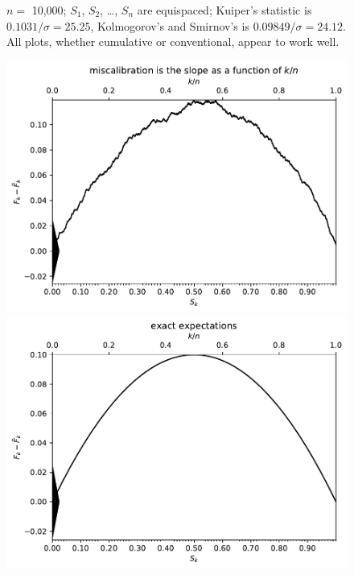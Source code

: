 \documentclass{article}
\begin{document}
\begin{figure}
\begin{centering}
\end{centering}
\caption{$n =$ 10,000; $S_1$, $S_2$, \dots, $S_n$ are equispaced;
         Kuiper's statistic is $0.1031 / \sigma = 25.25$,
         Kolmogorov's and Smirnov's is $0.09849 / \sigma = 24.12$.
All plots, whether cumulative or conventional, appear to work well.
}
\label{10000}
\end{figure}


\begin{figure}
\begin{centering}

\parbox{\imsize}{\includegraphics[width=\imsize]
                {./codes/unweighted/1000_10_0_0/cumulative.pdf}}
\quad\quad
\parbox{\imsize}{\includegraphics[width=\imsize]
                {./codes/unweighted/1000_10_0_0/cumulative_exact.pdf}}


\end{centering}
\end{figure}
\end{document}
